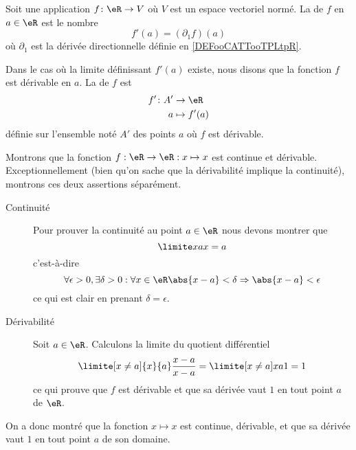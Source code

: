 \begin{definition}[Dérivée]      \label{DEFooOYFZooFWmcAB}
	Soit une application \(f \colon \eR\to V  \) où \( V\) est un espace vectoriel normé. La  de \( f\) en \( a\in \eR\) est le nombre
	\begin{equation}
		f'(a)=(\partial_1f)(a)
	\end{equation}
	où \( \partial_1\) est la dérivée directionnelle définie en \ref{DEFooCATTooTPLtpR}.

	Dans le cas où la limite définissant \( f'(a)\) existe, nous disons que la fonction \( f\) est dérivable en \( a\). La  de \( f\) est
	\begin{equation}
		\begin{aligned}
			f'\colon A' & \to \eR       \\
			a           & \mapsto f'(a)
		\end{aligned}
	\end{equation}
	définie sur l'ensemble noté \( A'\) des points \( a\) où \( f\) est dérivable.
\end{definition}

\begin{example}
	Montrons que la fonction \( f : \eR \to \eR : x\mapsto x\) est continue et dérivable. Exceptionnellement (bien qu'on sache que la dérivabilité implique la continuité), montrons ces deux assertions séparément.
	\begin{description}
		\item[Continuité] Pour prouver la continuité au point \( a \in \eR\) nous devons montrer que
			\begin{equation}
				\limite x a x = a
			\end{equation}
			c'est-à-dire
			\begin{equation}
				\forall \epsilon > 0, \exists \delta > 0 :  \forall x \in \eR \abs{x-a} <
				\delta \Rightarrow \abs{x-a} < \epsilon
			\end{equation}
			ce qui est clair en prenant \( \delta = \epsilon\).

		\item[Dérivabilité] Soit \( a \in \eR\). Calculons la limite du quotient différentiel
			\begin{equation}
				\limite[x\neq a]{x}{a} \frac{x-a}{x-a} = \limite[x\neq a]x a 1 = 1
			\end{equation}
			ce qui prouve que \( f\) est dérivable et que sa dérivée vaut \( 1\) en
			tout point \( a\) de \( \eR\).
	\end{description}

	On a donc montré que la fonction \( x \mapsto x\) est continue, dérivable, et que sa dérivée vaut \( 1\) en tout point \( a\) de son domaine.

\end{example}

